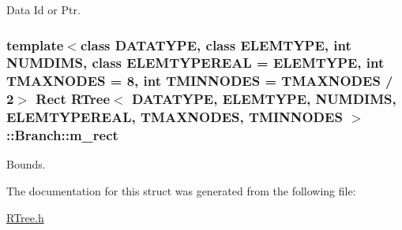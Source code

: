 Data Id or Ptr. 

\hypertarget{structRTree_1_1Branch_a7e98e0d7fb6afd18ec243450b22d9abe}{
\subsubsection[{m\-\_\-rect}]{\setlength{\rightskip}{0pt plus 5cm}template$<$class D\-A\-T\-A\-T\-Y\-P\-E, class E\-L\-E\-M\-T\-Y\-P\-E, int N\-U\-M\-D\-I\-M\-S, class E\-L\-E\-M\-T\-Y\-P\-E\-R\-E\-A\-L = E\-L\-E\-M\-T\-Y\-P\-E, int T\-M\-A\-X\-N\-O\-D\-E\-S = 8, int T\-M\-I\-N\-N\-O\-D\-E\-S = T\-M\-A\-X\-N\-O\-D\-E\-S / 2$>$ {\bf Rect} {\bf R\-Tree}$<$ D\-A\-T\-A\-T\-Y\-P\-E, E\-L\-E\-M\-T\-Y\-P\-E, N\-U\-M\-D\-I\-M\-S, E\-L\-E\-M\-T\-Y\-P\-E\-R\-E\-A\-L, T\-M\-A\-X\-N\-O\-D\-E\-S, T\-M\-I\-N\-N\-O\-D\-E\-S $>$\-::Branch\-::m\-\_\-rect}}\label{structRTree_1_1Branch_a7e98e0d7fb6afd18ec243450b22d9abe}


Bounds. 



The documentation for this struct was generated from the following file\-:\begin{DoxyCompactItemize}
\item 
\hyperlink{RTree_8h}{R\-Tree.\-h}\end{DoxyCompactItemize}
